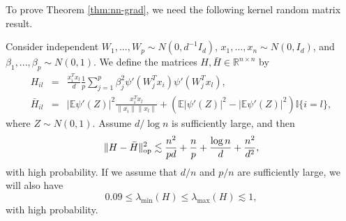 To prove Theorem \ref{thm:nn-grad}, we need the following kernel random matrix result.
\begin{lemma}\label{lem:lim-H}
Consider independent $W_1,...,W_p\sim N(0,d^{-1}I_d)$, $x_1,...,x_n\sim N(0,I_d)$, and $\beta_1,...,\beta_p\sim N(0,1)$. We define the matrices $H, \bar{H}\in\mathbb{R}^{n\times n}$ by
\begin{eqnarray*}
H_{il} &=& \frac{x_i^Tx_l}{d}\frac{1}{p}\sum_{j=1}^p\beta_j^2\psi'(W^T_jx_i)\psi'(W_j^Tx_l), \\
\bar{H}_{il} &=& |\mathbb{E}\psi'(Z)|^2\frac{x_i^Tx_l}{\|x_i\|\|x_l\|} + \left(\mathbb{E}|\psi'(Z)|^2-|\mathbb{E}\psi'(Z)|^2\right)\mathbb{I}\{i=l\},
\end{eqnarray*}
where $Z\sim N(0,1)$.
Assume $d/\log n$ is sufficiently large, and then
$$\|H-\bar{H}\|_{\rm op}^2 \lesssim \frac{n^2}{pd} + \frac{n}{p} + \frac{\log n}{d} + \frac{n^2}{d^2},$$
with high probability. If we assume that $d/n$ and $p/n$ are sufficiently large, we will also have
\begin{equation}
0.09\leq\lambda_{\min}(H)\leq \lambda_{\max}(H)\lesssim 1, \label{eq:spectrum-H-bound}
\end{equation}
with high probability.
\end{lemma}
